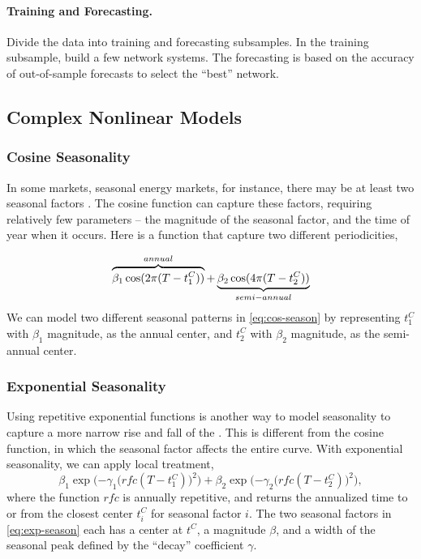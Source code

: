 \paragraph{Training and Forecasting.} Divide the data into training and forecasting subsamples. In the training subsample, build a few network systems. The forecasting is based on the accuracy of out-of-sample forecasts to select the ``best'' network. 

\subsection{Complex Nonlinear Models}\label{spectral methods}
\subsubsection{Cosine Seasonality}
In some markets, seasonal energy markets, for instance, there may be at least two seasonal factors \cite{pilipovic2007er}.
The cosine function can capture these factors, requiring relatively few parameters -- the magnitude of the seasonal factor, and the time of year when it occurs. Here is a function that capture two different periodicities,

\begin{equation}
\index{beta@$\beta$ (beta)!in regression}
\overbrace{\beta_1 \cos(2 \pi (T-t^C_1))}^{annual} + \underbrace{\beta_2 \cos(4 \pi(T-t^C_2))}_{semi-annual}
\label{eq:cos-season}
\end{equation}
We can model two different seasonal patterns in \eqref{eq:cos-season} by representing $t^C_1$ with $\beta_1$ magnitude, as the annual center, and $t^C_2$ with $\beta_2$ magnitude, as the semi-annual center.

\subsubsection{Exponential Seasonality}
Using repetitive exponential functions is another way to model seasonality to capture a more narrow rise and fall of the \fts{}. This is different from the cosine function, in which the seasonal factor affects the entire curve. With exponential seasonality, we can apply local treatment,
\begin{equation}
\beta_1 \exp\Big({-\gamma_1 \big(rfc(T-t^C_1)\big)^2} \Big)+ \beta_2 \exp\Big({-\gamma_2 \big(rfc(T-t^C_2)\big)^2} \Big),
\label{eq:exp-season}
\end{equation}
where the function $rfc$ is annually repetitive, and returns the annualized time to or from the closest center $t^C_i$ for seasonal factor $i$. The two seasonal factors in \eqref{eq:exp-season} each has a center at $t^C$, a magnitude $\beta$, and a width of the seasonal peak defined by the ``decay'' coefficient $\gamma$.

